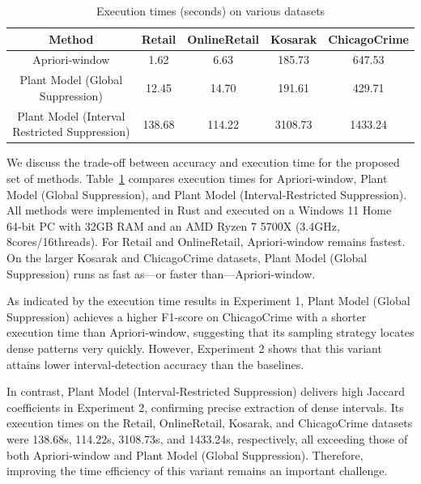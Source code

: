 \begin{table}[t]
\centering
\caption{Execution times (seconds) on various datasets}
\label{tab:exec-times}
\begin{tabular}{|c|cccc|}
\hline
\textbf{Method} & \textbf{Retail} & \textbf{OnlineRetail} & \textbf{Kosarak} & \textbf{ChicagoCrime} \\
\hline
Apriori-window & 1.62 & 6.63   & 185.73  & 647.53  \\
Plant Model (Global Suppression)           & 12.45  & 14.70  & 191.61  & 429.71  \\
Plant Model (Interval Restricted Suppression) & 138.68 & 114.22 & 3108.73 & 1433.24 \\
\hline
\end{tabular}
\end{table}



We discuss the trade-off between accuracy and execution time for the proposed set of methods.
Table~\ref{tab:exec-times} compares execution times for Apriori‑window, Plant Model (Global Suppression), and Plant Model (Interval‑Restricted Suppression). 
All methods were implemented in Rust and executed on a Windows 11 Home 64‑bit PC with 32GB RAM and an AMD Ryzen 7 5700X (3.4GHz, 8cores/16threads).
For Retail and OnlineRetail, Apriori‑window remains fastest. On the larger Kosarak and ChicagoCrime datasets, Plant Model (Global Suppression) runs as fast as—or faster than—Apriori‑window.

As indicated by the execution time results in Experiment 1, Plant Model (Global Suppression) achieves a higher F1-score on ChicagoCrime with a shorter execution time than Apriori‑window, suggesting that its sampling strategy locates dense patterns very quickly. However, Experiment 2 shows that this variant attains lower interval‑detection accuracy than the baselines.

In contrast, Plant Model (Interval‑Restricted Suppression) delivers high Jaccard coefficients in Experiment 2, confirming precise extraction of dense intervals. Its execution times on the Retail, OnlineRetail, Kosarak, and ChicagoCrime datasets were 138.68s, 114.22s, 3108.73s, and 1433.24s, respectively, all exceeding those of both Apriori‑window and Plant Model (Global Suppression). Therefore, improving the time efficiency of this variant remains an important challenge.

